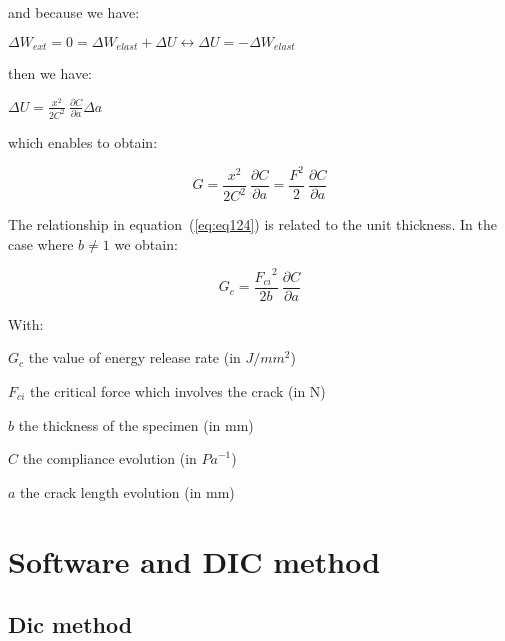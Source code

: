 and because we have:

$\Delta W_{ext}=0=\Delta W_{elast}+\Delta U\leftrightarrow \Delta U =-\Delta W_{elast}$

then we have:

$\Delta U=\displaystyle\frac{x^2}{2C^2}\ \frac{\partial C}{\partial a}\Delta a$

which enables to obtain:

\begin{equation}
	G=\frac{x^2}{2C^2}\ \frac{\partial C}{\partial a}=\frac{F^2}{2}\ \frac{\partial C}{\partial a}
	\label{eq:eq124}
\end{equation}

The relationship in equation~(\ref{eq:eq124}) is related to the unit thickness. In the case where $b\neq1$
we obtain:

\begin{equation}
	G_c=\frac{{F_{ci}}^2}{2b}\ \frac{\partial C}{\partial a}
	\label{eq:eq125}
\end{equation}

With:

$G_c$ the value of energy release rate (in $J/mm^2$)

$F_{ci}$ the critical force which involves the crack (in N)

$b$ the thickness of the specimen (in mm)

$C$ the compliance evolution (in ${Pa}^{-1}$)

$a$ the crack length evolution (in mm)



\section{Software and DIC method}

\subsection{Dic method}

